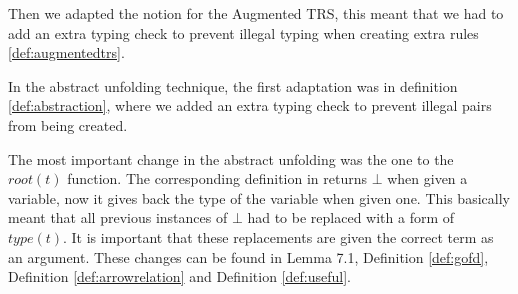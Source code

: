 Then we adapted the notion for the Augmented TRS, this meant that we had to add an extra typing check to prevent illegal typing when creating extra rules \ref{def:augmentedtrs}.

In the abstract unfolding technique, the first adaptation was in definition \ref{def:abstraction}, where we added an extra typing check to prevent illegal pairs from being created. 

The most important change in the abstract unfolding was the one to the $\textit{root}(t)$ function. The corresponding definition in \cite{Payet:Unfolding} returns $\bot$ when given a variable, now it gives back the type of the variable when given one. This basically meant that all previous instances of $\bot$ had to be replaced with a form of $\textit{type}(t)$. It is important that these replacements are given the correct term as an argument. These changes can be found in Lemma 7.1, Definition \ref{def:gofd}, Definition \ref{def:arrowrelation} and Definition \ref{def:useful}.
